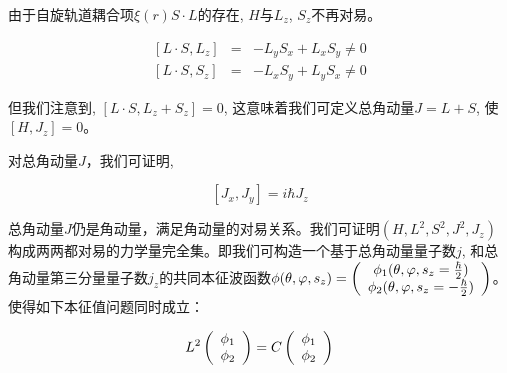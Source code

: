 由于自旋轨道耦合项$\xi \left( r \right)S \cdot L$的存在, $H$与$L_z$, $S_z$不再对易。

\begin{eqnarray*}
  \left[ L \cdot S, L_z \right] &=& -L_y S_x + L_x S_y \neq 0 \\
  \left[ L \cdot S, S_z \right] &=& -L_x S_y + L_y S_x \neq 0
\end{eqnarray*}

但我们注意到, $\left[ L \cdot S, L_z +S_z  \right] = 0$,
这意味着我们可定义总角动量$J = L+S$, 使$[H, J_z] = 0$。

对总角动量$J$，我们可证明,

\begin{equation*}
    \left[ J_x, J_y \right] = i \hbar J_z
\end{equation*}

总角动量$J$仍是角动量，满足角动量的对易关系。我们可证明$(H, L^2, S^2,
J^2, J_z)$
构成两两都对易的力学量完全集。即我们可构造一个基于总角动量量子数$j$,
和总角动量第三分量量子数$j_z$的共同本征波函数$\phi (\theta, \varphi,
s_z) = \left( {\begin{array}{*{20}c} \phi_1(\theta, \varphi, s_z =
\frac{\hbar}{2}) \\ \phi_2(\theta, \varphi, s_z = - \frac{\hbar}{2})
\\ \end{array} } \right)$。使得如下本征值问题同时成立：

\begin{equation*}
    L^2 \left( {\begin{array}{*{20}c}
   \phi_1  \\
   \phi_2  \\
 \end{array} } \right)
= C\left( {\begin{array}{*{20}c}
   \phi_1  \\
   \phi_2  \\
 \end{array} } \right)
\end{equation*}


